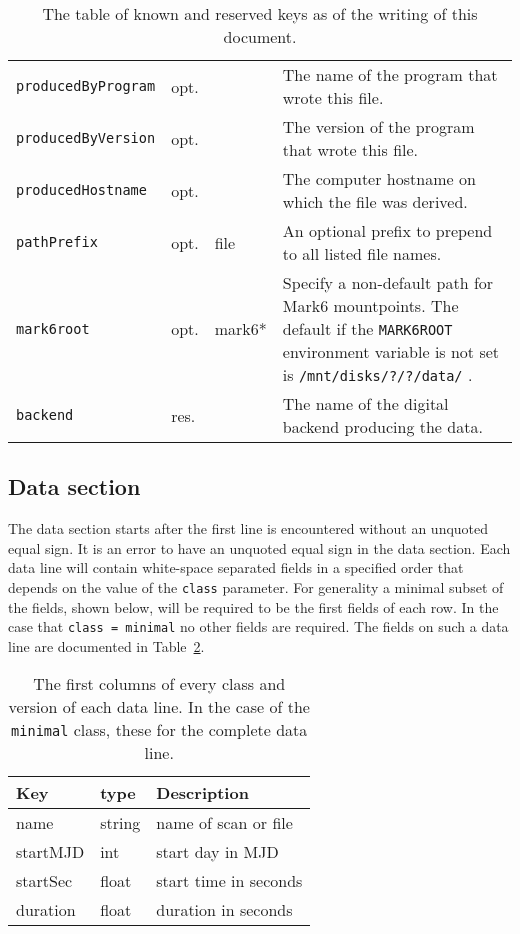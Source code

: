 \documentclass[12pt]{article}
\begin{document}
\begin{table}[h]
\begin{tabularx}{\textwidth}{lllX}
{\tt producedByProgram} & opt.  &        & The name of the program that wrote this file. \\
{\tt producedByVersion} & opt.  &        & The version of the program that wrote this file. \\
{\tt producedHostname}  & opt.  &        & The computer hostname on which the file was derived. \\
{\tt pathPrefix}        & opt.  & file   & An optional prefix to prepend to all listed file names. \\
{\tt mark6root}         & opt.  & mark6* & Specify a non-default path for Mark6 mountpoints.  The default if the {\tt MARK6ROOT} environment variable is not set is {\tt /mnt/disks/?/?/data/} . \\
{\tt backend}           & res.  &        & The name of the digital backend producing the data. \\
\hline
\hline
\end{tabularx}
\caption{\label{tab:keys}
The table of known and reserved keys as of the writing of this document.
}
\end{table}


\subsection{Data section} \label{sec:data}

The data section starts after the first line is encountered without an unquoted equal sign.
It is an error to have an unquoted equal sign in the data section.
Each data line will contain white-space separated fields in a specified order that depends on the value of the {\tt class} parameter.
For generality a minimal subset of the fields, shown below, will be required to be the first fields of each row.
In the case that {\tt class = minimal} no other fields are required.
The fields on such a data line are documented in Table~\ref{tab:minimaldata}.

\begin{table}[h]
\begin{tabularx}{\textwidth}{llX}
\hline
Key & type & Description \\
\hline
name & string & name of scan or file \\
startMJD & int & start day in MJD \\
startSec & float & start time in seconds \\
duration & float & duration in seconds \\
\hline
\hline
\end{tabularx}
\caption{\label{tab:minimaldata}
The first columns of every class and version of each data line.  In the case of the {\tt minimal} class, these for the complete data line.
}
\end{table}
\end{document}
